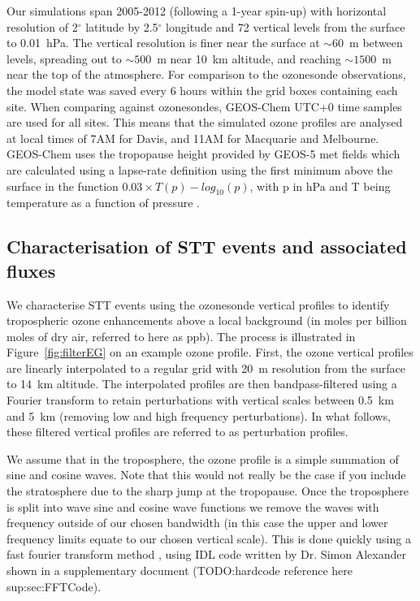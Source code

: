 \documentclass[acp, manuscript]{copernicus} %
\begin{document}
    Our simulations span 2005-2012 (following a 1-year spin-up) with horizontal resolution of 2$^{\circ}$ latitude by 2.5$^{\circ}$ longitude and 72 vertical levels from the surface to 0.01~hPa.
    The vertical resolution is finer near the surface at $\sim 60$~m between levels, spreading out to $\sim 500$~m near 10~km altitude, and reaching $\sim 1500$~m near the top of the atmosphere.
    For comparison to the ozonesonde observations, the model state was saved every 6 hours within the grid boxes containing each site.
    When comparing against ozonesondes, GEOS-Chem UTC+0 time samples are used for all sites.
    This means that the simulated ozone profiles are analysed at local times of 7AM for Davis, and 11AM for Macquarie and Melbourne.
    GEOS-Chem uses the tropopause height provided by GEOS-5 met fields which are calculated using a lapse-rate definition using the first minimum above the surface in the function $0.03 \times T(p) - log_{10}(p)$, with p in hPa and T being temperature as a function of pressure \citep{Rienecker2008}.
    
  \subsection{Characterisation of STT events and associated fluxes}
    \label{Section:CharacterisationOfSTTs}
    
    We characterise STT events using the ozonesonde vertical profiles to identify tropospheric ozone enhancements above a local background (in moles per billion moles of dry air, referred to here as ppb).
    The process is illustrated in Figure~\ref{fig:filterEG} on an example ozone profile.
    First, the ozone vertical profiles are linearly interpolated to a regular grid with 20~m resolution from the surface to 14~km altitude. 
    The interpolated profiles are then bandpass-filtered using a Fourier transform to retain perturbations with vertical scales between 0.5~km and 5~km (removing low and high frequency perturbations).
    In what follows, these filtered vertical profiles are referred to as perturbation profiles.
    
    We assume that in the troposphere, the ozone profile is a simple summation of sine and cosine waves.
    Note that this would not really be the case if you include the stratosphere due to the sharp jump at the tropopause.
    Once the troposphere is split into wave sine and cosine wave functions we remove the waves with frequency outside of our chosen bandwidth (in this case the upper and lower frequency limits equate to our chosen vertical scale).
    This is done quickly using a fast fourier transform method \citep{Press1992}, using IDL code written by Dr. Simon Alexander shown in a supplementary document (TODO:hardcode reference here sup:sec:FFTCode).
    
\end{document}
